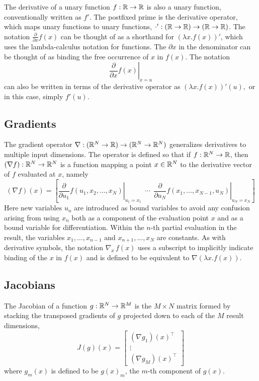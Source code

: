 \documentclass[10pt]{article}
\begin{document}
The derivative of a unary function $f:\mathbb{R} \rightarrow \mathbb{R}$ is
also a unary function, conventionally written as $f'$.  The postfixed prime is
the derivative operator, which maps unary functions to unary
functions, $\cdot' : \left(\mathbb{R} \rightarrow \mathbb{R}\right)
\rightarrow \left(\mathbb{R} \rightarrow \mathbb{R}\right)$.  The notation
$\frac{\partial}{\partial x} f(x)$ can be thought of as a shorthand
for $\left( \lambda x. f(x) \right)'$, which uses the lambda-calculus
notation for functions. The $\partial x$ in the denominator can be
thought of as binding the free occurrence of $x$ in $f(x)$.  The
notation
\[
\left. \frac{\partial}{\partial x} f(x) \right|_{x = u}
\]
can also be written in terms of the derivative operator as $\left(
  \lambda x. f(x) \right)'(u),$ or in this case, simply $f'(u)$.

\subsection{Gradients}

The gradient operator $\nabla:(\mathbb{R}^N \rightarrow \mathbb{R})\rightarrow
(\mathbb{R}^N \rightarrow \mathbb{R}^N)$ generalizes derivatives to multiple
input dimensions.  The operator is defined so that if
$f : \mathbb{R}^N \rightarrow \mathbb{R}$, then $(\nabla f):\mathbb{R}^N \rightarrow
\mathbb{R}^N$ is a function mapping a point $x \in \mathbb{R}^N$ to the
derivative vector of $f$ evaluated at $x$, namely
%
\[
(\nabla f)(x) 
= 
\left[
  \left. 
    \frac{\partial}{\partial u_1} f(u_1,x_2,\ldots,x_N)
  \right|_{u_1 = x_1}
  \ \ \cdots \ \ 
  \left. 
    \frac{\partial}{\partial u_N}  f(x_1,\ldots,x_{N-1},u_N)
   \right|_{u_N = x_N}
\right]
\]
%
Here new variables $u_n$ are introduced as bound variables to avoid
any confusion arising from using $x_n$ both as a component of the
evaluation point $x$ and as a bound variable for differentiation.
Within the $n$-th partial evaluation in the result, the variables
$x_1,\ldots,x_{n-1}$ and $x_{n+1},\ldots,x_N$ are constants.  As with
derivative symbols, the notation $\nabla_{\!x} \, f(x)$ uses a
subscript to implicitly indicate binding of the $x$ in $f(x)$ and is
defined to be equivalent to $\nabla(\lambda x. f(x))$.

\subsection{Jacobians}

The Jacobian of a function $g : \mathbb{R}^N \rightarrow \mathbb{R}^M$ is 
the $M \times N$ matrix formed by stacking the transposed gradients of $g$ projected down to
each of the $M$ result dimensions,
%
\[
J(g)(x) = 
\left[
\begin{array}{c}
(\nabla g_1)(x)^{\top}
\\[2pt]
\vdots
\\[2pt]
(\nabla g_M)(x)^{\top}
\end{array}
\right]
\]
%
where $g_m(x)$ is defined to be $g(x)_m$, the $m$-th component of $g(x)$.
\end{document}
